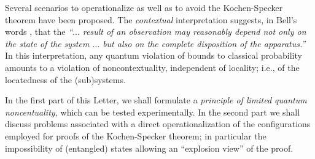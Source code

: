 \documentclass[prl,showpacs,showkeys,amsfonts]{revtex4}
\begin{document}
Several scenarios to operationalize
\cite{cabello-98,simon-2002,huang-2003} as well as to avoid
\cite{pitowsky-82,pitowsky-83,meyer:99}
the Kochen-Specker theorem have been proposed.
The {\it contextual} \cite{bell-66,hey-red,redhead} interpretation suggests,
in Bell's words \cite[Sect. 5]{bell-66}, that the {\em ``$\ldots$
result of an observation may reasonably depend
not only on the state of the system  $\ldots$
but also on the complete disposition  of the apparatus.''}
In this interpretation, any quantum violation of bounds to classical probability
amounts to a violation of noncontextuality,
independent of locality; i.e., of the locatedness of the (sub)systems.

In the first part of this Letter, we shall formulate a
{\em principle of limited quantum noncentuality,} which can be tested experimentally.
In the second part we shall discuss problems associated with a direct operationalization
of the configurations employed for proofs of the Kochen-Specker theorem; in particular
the impossibility of (entangled) states allowing an ``explosion view'' of the proof.

\end{document}

